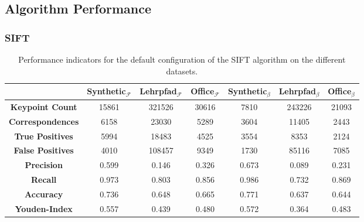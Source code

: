 \subsection{Algorithm Performance}

\subsubsection{SIFT}

\begin{table}
    {\renewcommand{\arraystretch}{1.3}%
    \setlength{\tabcolsep}{0.3em}%
    \begin{tabular}{ccccccc}
    \toprule
    \null &
        \textbf{Synthetic$_{\mathbf{\mathcal{F}}}$} &
        \textbf{Lehrpfad$_{\mathbf{\mathcal{F}}}$} &
        \textbf{Office$_{\mathbf{\mathcal{F}}}$} &
        \textbf{Synthetic$_{\mathbf{\mathcal{\beta}}}$} &
        \textbf{Lehrpfad$_{\mathbf{\mathcal{\beta}}}$} &
        \textbf{Office$_{\mathbf{\mathcal{\beta}}}$} \\
    \midrule
    \rowcolor{lightgray}
    \textbf{Keypoint Count} &
        \num{15861} & \num{321526} & \num{30616} &
        \num{7810} & \num{243226} & \num{21093} \\
    \textbf{Correspondences} &
        \num{6158} & \num{23030} & \num{5289} &
        \num{3604} & \num{11405} & \num{2443} \\
    \rowcolor{lightgray}
    \textbf{True Positives} &
        \num{5994} & \num{18483} & \num{4525} &
        \num{3554} & \num{8353} & \num{2124} \\
    \textbf{False Positives} &
        \num{4010} & \num{108457} & \num{9349} &
        \num{1730} & \num{85116} & \num{7085} \\
    \rowcolor{lightgray}
    \textbf{Precision} &
        \num{0.599} & \num{0.146} & \num{0.326} &
        \num{0.673} & \num{0.089} & \num{0.231} \\
    \textbf{Recall} &
        \num{0.973} & \num{0.803} & \num{0.856} &
        \num{0.986} & \num{0.732} & \num{0.869} \\
    \rowcolor{lightgray}
    \textbf{Accuracy} &
        \num{0.736} & \num{0.648} & \num{0.665} &
        \num{0.771} & \num{0.637} & \num{0.644} \\
    \textbf{Youden-Index} &
        \num{0.557} & \num{0.439} & \num{0.480} &
        \num{0.572} & \num{0.364} & \num{0.483} \\
    \bottomrule
    \end{tabular}
    }
    \caption{Performance indicators for the default configuration of the SIFT algorithm on the different datasets.}
\end{table}

